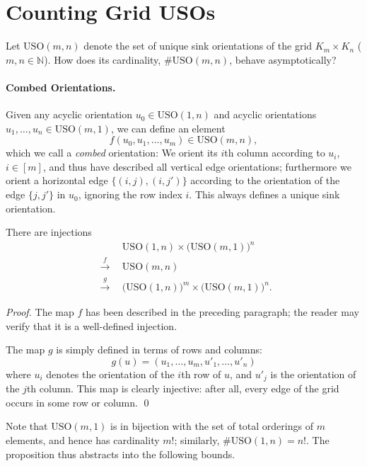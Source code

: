 \documentclass[runningheads,a4paper]{llncs}
\newcommand{\USO}{\ensuremath{\mathrm{USO}}}
\begin{document}
\section{Counting Grid USOs}
\label{section:counting_unique_sink_orientations}


Let $\USO(m,n)$ denote the set of unique sink orientations of the grid
$K_m \times K_n$ ($m,n \in \mathbb{N}$).
How does its cardinality, $\#\USO(m,n)$, behave asymptotically?

\paragraph{Combed Orientations.}
Given any acyclic orientation $u_0 \in \USO(1,n)$ and acyclic orientations
$u_1,\dots,u_n \in \USO(m,1)$, we can define an element
\[ f(u_0,u_1,\dots,u_m) \in \USO(m,n), \]
which we call a \emph{combed} orientation:
We orient its $i$th column according to $u_i$, $i \in [m]$, and thus have
described all vertical edge orientations; furthermore we orient a horizontal
edge $\{ (i,j), (i,j') \}$ according to the orientation of the edge
$\{ j,j' \}$ in $u_0$, ignoring the row index $i$.
This always defines a unique sink orientation.

\begin{proposition}
    There are injections
    \begin{align*}
        &
        \USO(1,n) \times \bigl( \USO(m,1) \bigr)^n
        \\
        ~~\stackrel{f}{\longrightarrow}~~
        &
        \USO(m,n)
        \\
        ~~\stackrel{g}{\longrightarrow}~~
        &
        \bigl( \USO(1,n) \bigr)^m \times \bigl( \USO(m,1) \bigr)^n .
    \end{align*}
\end{proposition}

\begin{proof}
    The map $f$ has been described in the preceding paragraph; the reader may
    verify that it is a well-defined injection.

    The map $g$ is simply defined in terms of rows and columns:
    \[ g(u) = (u_1, \dots, u_m, u'_1, \dots, u'_n) \]
    where $u_i$ denotes the orientation of the $i$th row of $u$, and $u'_j$ is
    the orientation of the $j$th column.
    This map is clearly injective: after all, every edge of the grid occurs in
    some row or column. \qed
\end{proof}

Note that $\USO(m,1)$ is in bijection with the set of total orderings of $m$
elements, and hence has cardinality $m!$; similarly, $\#\USO(1,n) = n!$.
The proposition thus abstracts into the following bounds.
\end{document}
